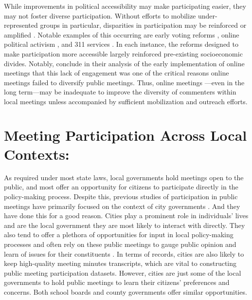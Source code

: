     While improvements in political accessibility may make participating easier, they may not foster diverse participation. Without efforts to mobilize under-represented groups in particular, disparities in participation may be reinforced or amplified \citep{verbaVoiceEqualityCivic1995}. Notable examples of this occurring are early voting reforms \citep{burdenElectionLawsMobilization2014}, online political activism \citep{chanPoliticalInequalityDigital2021}, and 311 services \citep{wichowskyCallResponseNeighborhood2022}. In each instance, the reforms designed to make participation more accessible largely reinforced pre-existing socioeconomic divides. Notably, \citet{einsteinStillMutedLimited2022} conclude in their analysis of the early implementation of online meetings that this lack of engagement was one of the critical reasons online meetings failed to diversify public meetings. Thus, online meetings —even in the long term—may be inadequate to improve the diversity of commenters within local meetings unless accompanied by sufficient mobilization and outreach efforts.

    \section{Meeting Participation Across Local Contexts:}

    As required under most state laws, local governments hold meetings open to the public, and most offer an opportunity for citizens to participate directly in the policy-making process. Despite this, previous studies of participation in public meetings have primarily focused on the context of city governments \citep[e.g.,][]{einsteinWhoParticipatesLocal2019}. And they have done this for a good reason. Cities play a prominent role in individuals' lives and are the local government they are most likely to interact with directly. They also tend to offer a plethora of opportunities for input in local policy-making processes \citep{nabatchiDirectPublicEngagement2014a,pinBridgingGapElectoral2022,choExperimentingPublicEngagement2021,wichowskyCallResponseNeighborhood2022} and often rely on these public meetings to gauge public opinion and learn of issues for their constituents \citep{einsteinMayorsPartisanshipRedistribution2018}. In terms of records, cities are also likely to keep high-quality meeting minutes transcripts, which are vital to constructing public meeting participation datasets. However, cities are just some of the local governments to hold public meetings to learn their citizens' preferences and concerns. Both school boards and county governments offer similar opportunities.

